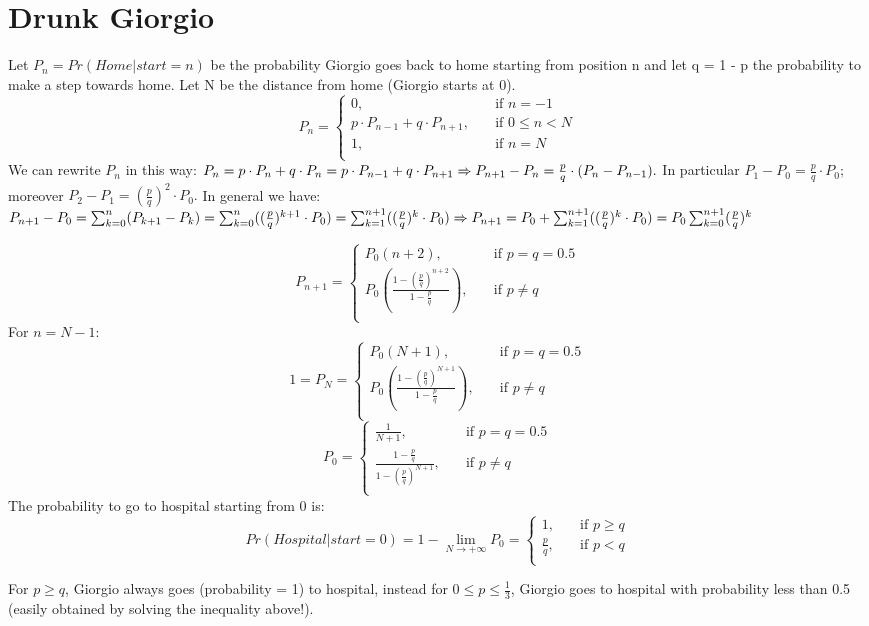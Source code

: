 \section{Drunk Giorgio}
Let $P_n = Pr(Home | start = n)$ be the probability Giorgio goes back to home starting from position n and let q = 1 - p the probability to make a step towards home. Let N be the distance from home (Giorgio starts at 0).
\[   
P_n = 
\begin{cases}
0, &\quad\text{if } n = -1\\
p \cdot P_{n-1} + q \cdot P_{n+1}, &\quad\text{if } 0 \leq n < N\\
1, &\quad\text{if } n = N\\
\end{cases}
\]
We can rewrite $P_n$ in this way:
$
P_n = p \cdot P_n + q \cdot P_n = p \cdot P_{n-1} + q \cdot P_{n+1}
\newline \Rightarrow P_{n+1} - P_n = \frac{p}{q} \cdot (P_n - P_{n-1}).
\newline$
In particular $P_1 - P_0 = \frac{p}{q} \cdot P_0;$ moreover $P_2 - P_1 = (\frac{p}{q})^2 \cdot P_0.$
In general we have: $P_{n+1} - P_0 = \sum_{k=0}^{n} (P_{k+1} - P_k) = \sum_{k=0}^{n} ((\frac{p}{q})^{k+1} \cdot P_0) = \sum_{k=1}^{n+1} ((\frac{p}{q})^{k} \cdot P_0)
\newline \Rightarrow P_{n+1} = P_0 + \sum_{k=1}^{n+1} ((\frac{p}{q})^{k} \cdot P_0) = P_0\sum_{k=0}^{n+1} (\frac{p}{q})^{k}$

\[   
P_{n+1} = 
\begin{cases}
P_0 (n+2), &\quad\text{if } p = q = 0.5\\
P_0 (\frac{1-(\frac{p}{q})^{n+2}}{1-\frac{p}{q}}), &\quad\text{if } p \neq q\\
\end{cases}
\]
For $n = N -1$:
\[   
1 = P_N = 
\begin{cases}
P_0 (N+1), &\quad\text{if } p = q = 0.5\\
P_0 (\frac{1-(\frac{p}{q})^{N+1}}{1-\frac{p}{q}}), &\quad\text{if } p \neq q\\
\end{cases}
\]
\[   
P_0 = 
\begin{cases}
\frac{1}{N+1}, &\quad\text{if } p = q = 0.5\\
\frac{1-\frac{p}{q}}{1-(\frac{p}{q})^{N+1}}, &\quad\text{if } p \neq q\\
\end{cases}
\]
The probability to go to hospital starting from 0 is:
\[   
Pr(Hospital | start = 0) = 1 - \lim_{N \to +\infty} P_0 =
\begin{cases}
1, &\quad\text{if } p \geq q\\
\frac{p}{q}, &\quad\text{if } p < q\\
\end{cases}
\]
 
For $p \geq q$, Giorgio always goes (probability = 1) to hospital, instead for $0 \leq p \leq \frac{1}{3}$, Giorgio goes to hospital with probability less than 0.5 (easily obtained by solving the inequality above!).
 
 
 
 
 
 
 
 
 